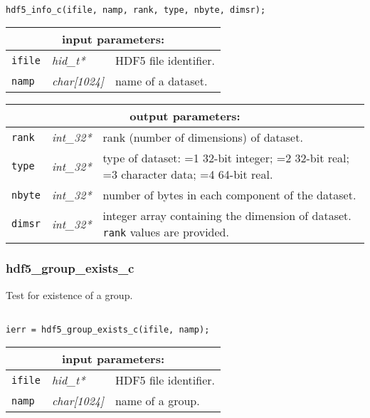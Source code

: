 \begin{verbatim}

hdf5_info_c(ifile, namp, rank, type, nbyte, dimsr);
\end{verbatim}

\noindent
\begin{tabular}{|p{1.5cm}|p{2cm}|p{11cm}|}
\hline
\multicolumn{3}{|c|}{\bf input parameters:} \\
\hline
{\tt ifile} & {\it hid\_t*} & HDF5 file identifier. \\
\hline
{\tt namp} & {\it char[1024]} & name of a dataset. \\
\hline
\end{tabular}

\vskip 0.8cm

\noindent
\begin{tabular}{|p{1.5cm}|p{2cm}|p{11cm}|}
\hline
\multicolumn{3}{|c|}{\bf output parameters:} \\
\hline
{\tt rank} & {\it int\_32*} & rank (number of dimensions) of dataset. \\
\hline
{\tt type} & {\it int\_32*} & type of dataset: =1 32-bit integer; 
                                    =2 32-bit real; =3 character data; 
				    =4 64-bit real. \\
\hline
{\tt nbyte} & {\it int\_32*} & number of bytes in each component of the dataset. \\
\hline
{\tt dimsr} & {\it int\_32*} & integer array containing the dimension of dataset. {\tt rank} values are provided. \\
\hline
\end{tabular}

\subsubsection{hdf5\_group\_exists\_c}

Test for existence of a group.

\begin{verbatim}

ierr = hdf5_group_exists_c(ifile, namp);
\end{verbatim}

\noindent
\begin{tabular}{|p{1.5cm}|p{2cm}|p{11cm}|}
\hline
\multicolumn{3}{|c|}{\bf input parameters:} \\
\hline
{\tt ifile} & {\it hid\_t*} & HDF5 file identifier. \\
\hline
{\tt namp} & {\it char[1024]} & name of a group. \\
\hline
\end{tabular}

